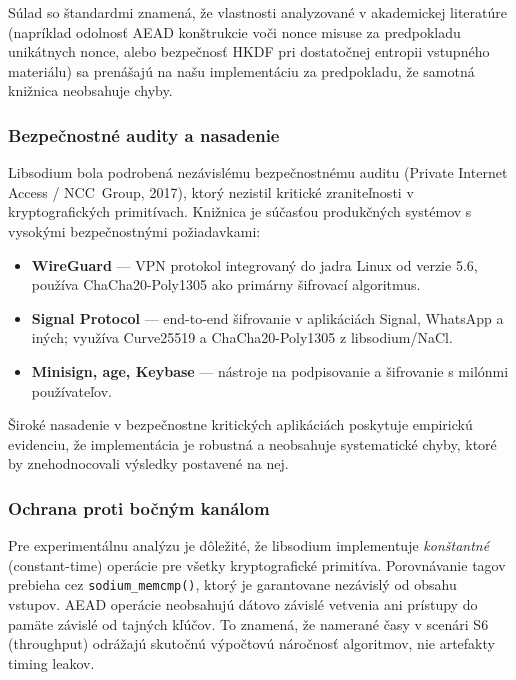 \documentclass[journal,a4paper,onecolumn]{IEEEtran}
\begin{document}
\noindent Súlad so štandardmi znamená, že vlastnosti analyzované v akademickej literatúre (napríklad odolnosť AEAD konštrukcie voči nonce misuse za predpokladu unikátnych nonce\cite{RogawayNonceMisuse2004}, alebo bezpečnosť HKDF pri dostatočnej entropii vstupného materiálu\cite{RFC5869}) sa prenášajú na našu implementáciu za predpokladu, že samotná knižnica neobsahuje chyby.

\subsubsection{Bezpečnostné audity a nasadenie}

Libsodium bola podrobená nezávislému bezpečnostnému auditu (Private Internet Access / NCC~Group, 2017\cite{LibsodiumAudit}), ktorý nezistil kritické zraniteľnosti v kryptografických primitívach. Knižnica je súčasťou produkčných systémov s vysokými bezpečnostnými požiadavkami:

\begin{itemize}[leftmargin=*,itemsep=2pt]
  \item \textbf{WireGuard}\cite{WireGuard} --- VPN protokol integrovaný do jadra Linux od verzie 5.6, používa ChaCha20-Poly1305 ako primárny šifrovací algoritmus.
  \item \textbf{Signal Protocol} --- end-to-end šifrovanie v aplikáciách Signal, WhatsApp a iných; využíva Curve25519 a ChaCha20-Poly1305 z libsodium/NaCl.
  \item \textbf{Minisign, age, Keybase} --- nástroje na podpisovanie a šifrovanie s milónmi používateľov.
\end{itemize}

\noindent Široké nasadenie v bezpečnostne kritických aplikáciách poskytuje empirickú evidenciu, že implementácia je robustná a neobsahuje systematické chyby, ktoré by znehodnocovali výsledky postavené na nej.

\subsubsection{Ochrana proti bočným kanálom}

Pre experimentálnu analýzu je dôležité, že libsodium implementuje \emph{konštantné} (constant-time) operácie pre všetky kryptografické primitíva. Porovnávanie tagov prebieha cez \texttt{sodium\_memcmp()}, ktorý je garantovane nezávislý od obsahu vstupov. AEAD operácie neobsahujú dátovo závislé vetvenia ani prístupy do pamäte závislé od tajných kľúčov\cite{LibsodiumDoc}. To znamená, že namerané časy v scenári S6 (throughput) odrážajú skutočnú výpočtovú náročnosť algoritmov, nie artefakty timing leakov.
\end{document}
